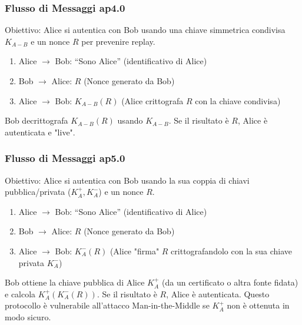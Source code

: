 \subsubsection{Flusso di Messaggi ap4.0}
\label{ssubsec:ap4_0_flow}
Obiettivo: Alice si autentica con Bob usando una chiave simmetrica condivisa $K_{A-B}$ e un nonce $R$ per prevenire replay.
\begin{enumerate}
    \item Alice $\rightarrow$ Bob: ``Sono Alice'' (identificativo di Alice)
    \item Bob $\rightarrow$ Alice: $R$ (Nonce generato da Bob)
    \item Alice $\rightarrow$ Bob: $K_{A-B}(R)$ (Alice crittografa $R$ con la chiave condivisa)
\end{enumerate}
Bob decrittografa $K_{A-B}(R)$ usando $K_{A-B}$. Se il risultato è $R$, Alice è autenticata e "live".

\subsubsection{Flusso di Messaggi ap5.0}
\label{ssubsec:ap5_0_flow}
Obiettivo: Alice si autentica con Bob usando la sua coppia di chiavi pubblica/privata ($K_A^+, K_A^-$) e un nonce $R$.
\begin{enumerate}
    \item Alice $\rightarrow$ Bob: ``Sono Alice'' (identificativo di Alice)
    \item Bob $\rightarrow$ Alice: $R$ (Nonce generato da Bob)
    \item Alice $\rightarrow$ Bob: $K_A^-(R)$ (Alice "firma" $R$ crittografandolo con la sua chiave privata $K_A^-$)
\end{enumerate}
Bob ottiene la chiave pubblica di Alice $K_A^+$ (da un certificato o altra fonte fidata) e calcola $K_A^+(K_A^-(R))$. Se il risultato è $R$, Alice è autenticata.
Questo protocollo è vulnerabile all'attacco Man-in-the-Middle se $K_A^+$ non è ottenuta in modo sicuro.

